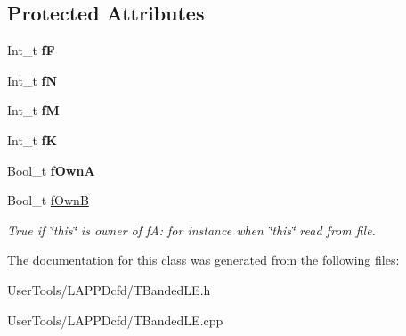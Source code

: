 \subsection*{Protected Attributes}
\begin{DoxyCompactItemize}
\item 
\hypertarget{classTBandedLE_afa73413ba63317a868c812df85841a4e}{Int\-\_\-t {\bfseries f\-F}}\label{classTBandedLE_afa73413ba63317a868c812df85841a4e}

\item 
\hypertarget{classTBandedLE_a76a6c05a5fe84896598cfe33ce77c949}{Int\-\_\-t {\bfseries f\-N}}\label{classTBandedLE_a76a6c05a5fe84896598cfe33ce77c949}

\item 
\hypertarget{classTBandedLE_afa5e70a3e99ae956dfba9b0111ca800e}{Int\-\_\-t {\bfseries f\-M}}\label{classTBandedLE_afa5e70a3e99ae956dfba9b0111ca800e}

\item 
\hypertarget{classTBandedLE_a30e79aaa49cecea99aa050c9557f5be2}{Int\-\_\-t {\bfseries f\-K}}\label{classTBandedLE_a30e79aaa49cecea99aa050c9557f5be2}

\item 
\hypertarget{classTBandedLE_a69db48fd34971c7255eb9861c5294211}{Bool\-\_\-t {\bfseries f\-Own\-A}}\label{classTBandedLE_a69db48fd34971c7255eb9861c5294211}

\item 
\hypertarget{classTBandedLE_a3b636066f321209c7e223d221679915a}{Bool\-\_\-t \hyperlink{classTBandedLE_a3b636066f321209c7e223d221679915a}{f\-Own\-B}}\label{classTBandedLE_a3b636066f321209c7e223d221679915a}

\begin{DoxyCompactList}\small\item\em True if \char`\"{}this\char`\"{} is owner of f\-A\-: for instance when \char`\"{}this\char`\"{} read from file. \end{DoxyCompactList}\end{DoxyCompactItemize}


The documentation for this class was generated from the following files\-:\begin{DoxyCompactItemize}
\item 
User\-Tools/\-L\-A\-P\-P\-Dcfd/T\-Banded\-L\-E.\-h\item 
User\-Tools/\-L\-A\-P\-P\-Dcfd/T\-Banded\-L\-E.\-cpp\end{DoxyCompactItemize}
